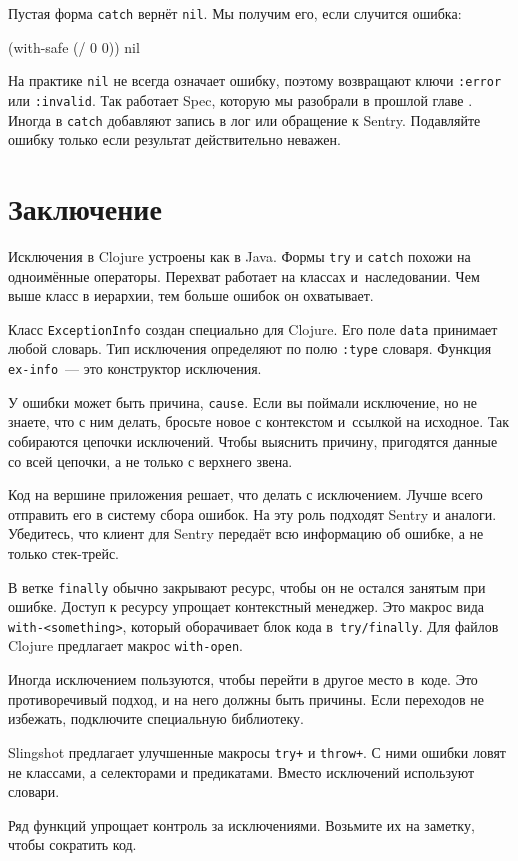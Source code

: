 \noindent
Пустая форма \verb|catch| вернёт \verb|nil|. Мы получим его, если случится
ошибка:

\begin{english}
  \begin{clojure}
(with-safe (/ 0 0))
nil
  \end{clojure}
\end{english}

На практике \verb|nil| не всегда означает ошибку, поэтому возвращают ключи
\verb|:error| или \verb|:invalid|. Так работает Spec, которую мы разобрали в
прошлой главе . Иногда в \verb|catch| добавляют запись в
лог или обращение к Sentry. Подавляйте ошибку только если результат
действительно неважен.

\section{Заключение}

Исключения в Clojure устроены как в Java. Формы \verb|try| и \verb|catch| похожи
на одноимённые операторы. Перехват работает на классах и~наследовании. Чем выше
класс в иерархии, тем больше ошибок он охватывает.

Класс \verb|ExceptionInfo| создан специально для Clojure. Его поле
\verb|data| принимает любой словарь. Тип исключения определяют по полю
\verb|:type| словаря. Функция \verb|ex-info|~--- это конструктор исключения.

У ошибки может быть причина, \verb|cause|. Если вы поймали исключение, но не
знаете, что с ним делать, бросьте новое с контекстом и~ссылкой на исходное. Так
собираются цепочки исключений. Чтобы выяснить причину, пригодятся данные со всей
цепочки, а не только с верхнего звена.

Код на вершине приложения решает, что делать с исключением. Лучше всего
отправить его в систему сбора ошибок. На эту роль подходят Sentry и
аналоги. Убедитесь, что клиент для Sentry передаёт всю информацию об ошибке, а не
только стек-трейс.

В ветке \verb|finally| обычно закрывают ресурс, чтобы он не остался занятым
при ошибке. Доступ к ресурсу упрощает контекстный менеджер. Это макрос вида
\verb|with-<something>|, который оборачивает блок кода
в~\verb|try/finally|. Для файлов Clojure предлагает макрос \verb|with-open|.

Иногда исключением пользуются, чтобы перейти в другое место в~коде. Это
противоречивый подход, и на него должны быть причины. Если переходов не
избежать, подключите специальную библиотеку.

Slingshot предлагает улучшенные макросы \verb|try+| и \verb|throw+|. С ними
ошибки ловят не классами, а селекторами и предикатами. Вместо исключений
используют словари.

Ряд функций упрощает контроль за исключениями. Возьмите их на заметку, чтобы
сократить код.

